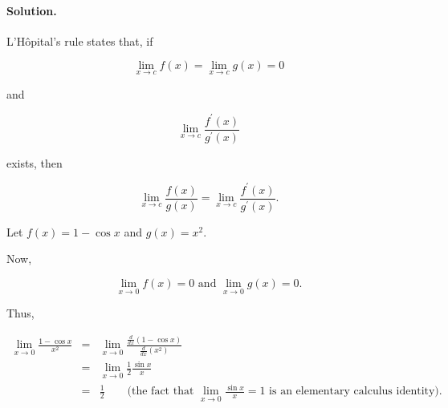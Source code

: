 

\paragraph{Solution.}

L'H\^{o}pital's rule states that, if

\[\lim_{x\to c}f\left(x\right)=\lim_{x\to c}g\left(x\right)=0\]

and

\[\lim_{x\to c}\frac{f^\prime\left(x\right)}{g^\prime\left(x\right)}\]

exists, then

\[\lim_{x\to c}\frac{f\left(x\right)}{g\left(x\right)}=\lim_{x\to c}\frac{f^\prime\left(x\right)}{g^\prime\left(x\right)}.\]

Let $f\left(x\right)=1-\cos x$ and $g\left(x\right)=x^2$.

Now,

\[\lim_{x\to0}f\left(x\right)=0\mbox{ and }\lim_{x\to0}g\left(x\right)=0.\]

Thus,

\begin{eqnarray*}
	\lim_{x\to0}\frac{1-\cos x}{x^2}&=&\lim_{x\to0}\frac{\frac{d}{dx}\left(1-\cos x\right)}{\frac{d}{dx}\left(x^2\right)}\\
	&=&\lim_{x\to0}\frac{1}{2}\frac{\sin x}{x}\\
	&=&\frac{1}{2}\qquad\mbox{(the fact that }\lim_{x\to0}\frac{\sin x}{x}=1\mbox{ is an elementary calculus identity).}
\end{eqnarray*}
